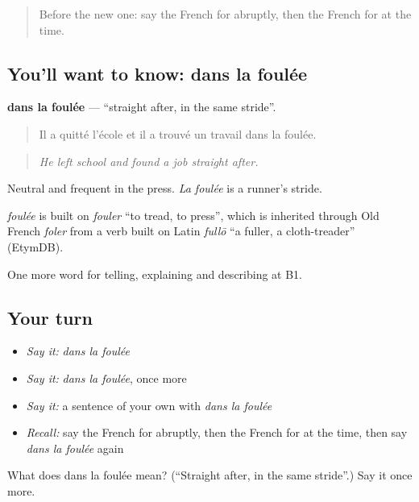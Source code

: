 \label{lesson:FR-C270-dans-la-foulee}



\begin{quote}
Before the new one: say the French for abruptly, then the French for at the time.
\end{quote}

\subsection*{You'll want to know: dans la foulée}
\textbf{dans la foulée} — \textquotedblleft{}straight after, in the same stride\textquotedblright{}.

\begin{quote}
Il a quitté l'école et il a trouvé un travail dans la foulée.
\end{quote}

\begin{quote}
\emph{He left school and found a job straight after.}
\end{quote}

Neutral and frequent in the press. \emph{La foulée} is a runner's stride.

\begin{cousinweb}
\emph{foulée} is built on \emph{fouler} \textquotedblleft{}to tread, to press\textquotedblright{}, which is inherited through Old French \emph{foler} from a verb built on Latin \emph{fullō} \textquotedblleft{}a fuller, a cloth-treader\textquotedblright{} (EtymDB).
\end{cousinweb}

\begin{grammarlens}[title={What you've built}]
One more word for telling, explaining and describing at B1.
\end{grammarlens}

\subsection*{Your turn}
\begin{itemize}
\raggedright
  \item \emph{Say it:} \emph{dans la foulée}
  \item \emph{Say it:} \emph{dans la foulée}, once more
  \item \emph{Say it:} a sentence of your own with \emph{dans la foulée}
  \item \emph{Recall:} say the French for abruptly, then the French for at the time, then say \emph{dans la foulée} again
\end{itemize}

\begin{tcolorbox}[breakable,colback=teal!4,colframe=teal!35!black,title={Before you move on}]
What does dans la foulée mean? (\textquotedblleft{}Straight after, in the same stride\textquotedblright{}.) Say it once more.
\end{tcolorbox}
